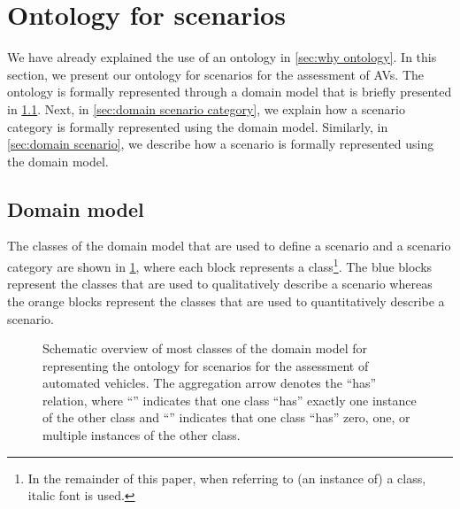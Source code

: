 \section{Ontology for scenarios}
\label{sec:ontology}

We have already explained the use of an ontology in \cref{sec:why ontology}. In this section, we present our ontology for scenarios for the assessment of AVs. 
The ontology is formally represented through a domain model that is briefly presented in \cref{sec:domain model}. Next, in \cref{sec:domain scenario category}, we explain how a scenario category is formally represented using the domain model. Similarly, in \cref{sec:domain scenario}, we describe how a scenario is formally represented using the domain model. 



\subsection{Domain model}
\label{sec:domain model}

The classes of the domain model that are used to define a scenario and a scenario category are shown in \cref{fig:ontology classes}, where each block represents a class\footnote{In the remainder of this paper, when referring to (an instance of) a class, italic font is used.}.
The blue blocks represent the classes that are used to qualitatively describe a scenario whereas the orange blocks represent the classes that are used to quantitatively describe a scenario. 

\begin{figure}[t]
	\centering
	
	\caption{Schematic overview of most classes of the domain model for representing the ontology for scenarios for the assessment of automated vehicles. The aggregation arrow denotes the ``has'' relation, where ``\hasone'' indicates that one class ``has'' exactly one instance of the other class and ``\hasn'' indicates that one class ``has'' zero, one, or multiple instances of the other class.}
	\label{fig:ontology classes}
\end{figure}

